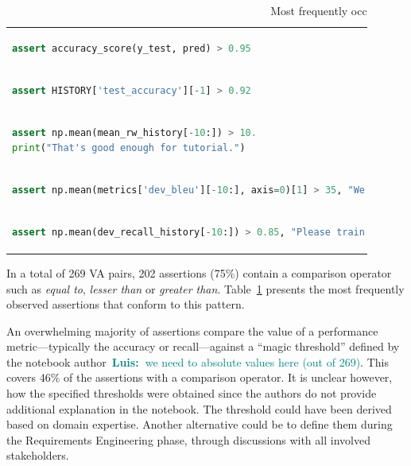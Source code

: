 \documentclass[conference]{IEEEtran}
\newcommand{\luis}[1]{\textcolor{teal}{\ding{46}~\textbf{Luis:~}#1}}
\begin{document}
\begin{table}
  \centering
  \caption{Most frequently occurring assertions that use a comparison operator.}
  \begin{tabular}{@{}m{0.9\linewidth}@{}}
    \toprule
    \begin{lstlisting}[language=Python,belowskip=0pt,aboveskip=0pt]
assert accuracy_score(y_test, pred) > 0.95\end{lstlisting}\\
    \begin{lstlisting}[language=Python,belowskip=0pt,aboveskip=0pt]
assert HISTORY['test_accuracy'][-1] > 0.92\end{lstlisting}\\
    \begin{lstlisting}[language=Python,belowskip=0pt,aboveskip=0pt]
assert np.mean(mean_rw_history[-10:]) > 10.
print("That's good enough for tutorial.")\end{lstlisting}\\
    \begin{lstlisting}[language=Python,belowskip=0pt,aboveskip=0pt]
assert np.mean(metrics['dev_bleu'][-10:], axis=0)[1] > 35, "We kind of need a higher bleu BLEU from you. Kind of right now."\end{lstlisting}\\
    \begin{lstlisting}[language=python,belowskip=0pt,aboveskip=0pt]
assert np.mean(dev_recall_history[-10:]) > 0.85, "Please train for at least 85% recall on test set. You may need to change vectorizer model for that."
    \end{lstlisting}\\
    \bottomrule
  \end{tabular}
  \label{tab:compare-op-asserts}
\end{table}

In a total of 269 VA pairs, 202 assertions (75\%) contain a comparison operator such as \emph{equal to}, \emph{lesser than} or \emph{greater than}. Table~\ref{tab:compare-op-asserts} presents the most frequently observed assertions that conform to this pattern.

An overwhelming majority of assertions compare the value of a performance metric---typically the accuracy or recall---against a ``magic threshold'' defined by the notebook author\luis{we need to absolute values here (out of 269)}. This covers 46\% of the assertions with a comparison operator. It is unclear however, how the specified thresholds were obtained since the authors do not provide additional explanation in the notebook. The threshold could have been derived based on domain expertise. Another alternative could be to define them during the Requirements Engineering phase, through discussions with all involved stakeholders\cite{vogelsang2019requirementsi,rahimi2019toward}.
\end{document}

